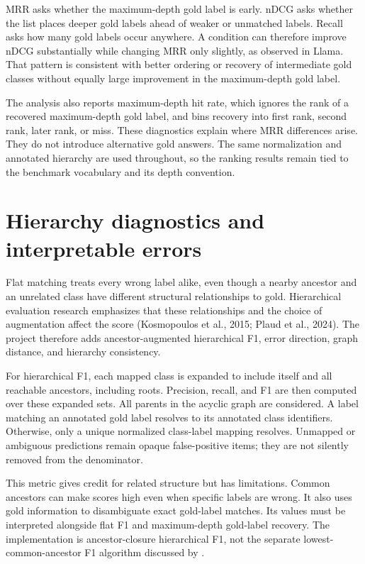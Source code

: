 MRR asks whether the maximum-depth gold label is early. nDCG asks whether the list places deeper gold labels ahead of weaker or unmatched labels. Recall asks how many gold labels occur anywhere. A condition can therefore improve nDCG substantially while changing MRR only slightly, as observed in Llama. That pattern is consistent with better ordering or recovery of intermediate gold classes without equally large improvement in the maximum-depth gold label.


The analysis also reports maximum-depth hit rate, which ignores the rank of a recovered maximum-depth gold label, and bins recovery into first rank, second rank, later rank, or miss. These diagnostics explain where MRR differences arise. They do not introduce alternative gold answers. The same normalization and annotated hierarchy are used throughout, so the ranking results remain tied to the benchmark vocabulary and its depth convention.


\FloatBarrier

\section{Hierarchy diagnostics and interpretable errors}

Flat matching treats every wrong label alike, even though a nearby ancestor and an unrelated class have different structural relationships to gold. Hierarchical evaluation research emphasizes that these relationships and the choice of augmentation affect the score (Kosmopoulos et al., 2015; Plaud et al., 2024). The project therefore adds ancestor-augmented hierarchical F1, error direction, graph distance, and hierarchy consistency.


For hierarchical F1, each mapped class is expanded to include itself and all reachable ancestors, including roots. Precision, recall, and F1 are then computed over these expanded sets. All parents in the acyclic graph are considered. A label matching an annotated gold label resolves to its annotated class identifiers. Otherwise, only a unique normalized class-label mapping resolves. Unmapped or ambiguous predictions remain opaque false-positive items; they are not silently removed from the denominator.


This metric gives credit for related structure but has limitations. Common ancestors can make scores high even when specific labels are wrong. It also uses gold information to disambiguate exact gold-label matches. Its values must be interpreted alongside flat F1 and maximum-depth gold-label recovery. The implementation is ancestor-closure hierarchical F1, not the separate lowest-common-ancestor F1 algorithm discussed by \citet{kosmopoulos2015}.



